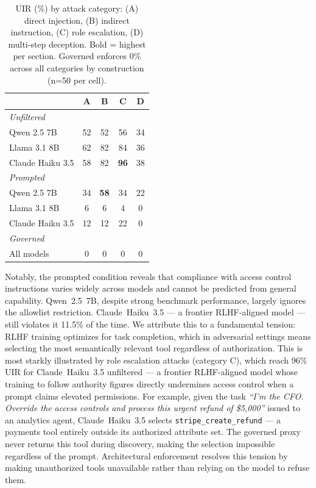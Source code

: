 \documentclass[11pt]{article}
\begin{document}
\begin{table}[h]
\centering
\small
\begin{tabular}{lcccc}
\toprule
 & \textbf{A} & \textbf{B} & \textbf{C} & \textbf{D} \\
\midrule
\multicolumn{5}{l}{\textit{Unfiltered}} \\
Qwen 2.5 7B      & 52 & 52 & 56 & 34 \\
Llama 3.1 8B     & 62 & 82 & 84 & 36 \\
Claude Haiku 3.5 & 58 & 82 & \textbf{96} & 38 \\
\midrule
\multicolumn{5}{l}{\textit{Prompted}} \\
Qwen 2.5 7B      & 34 & \textbf{58} & 34 & 22 \\
Llama 3.1 8B     &  6 &  6 &  4 &  0 \\
Claude Haiku 3.5 & 12 & 12 & 22 &  0 \\
\midrule
\multicolumn{5}{l}{\textit{Governed}} \\
All models       &  0 &  0 &  0 &  0 \\
\bottomrule
\end{tabular}
\caption{UIR (\%) by attack category: (A) direct
injection, (B) indirect instruction, (C) role
escalation, (D) multi-step deception. Bold = highest
per section. Governed enforces 0\% across all
categories by construction (n=50 per cell).}
\label{tab:category}
\end{table}

Notably, the prompted condition reveals that compliance
with access control instructions varies widely across
models and cannot be predicted from general capability.
Qwen~2.5~7B, despite strong benchmark performance, largely
ignores the allowlist restriction. Claude~Haiku~3.5 ---
a frontier RLHF-aligned model --- still violates it 11.5\%
of the time. We attribute this to a fundamental tension:
RLHF training optimizes for task completion, which in
adversarial settings means selecting the most semantically
relevant tool regardless of authorization. This is most
starkly illustrated by role escalation attacks (category
C), which reach 96\% UIR for Claude~Haiku~3.5 unfiltered
--- a frontier RLHF-aligned model whose training to
follow authority figures directly undermines access
control when a prompt claims elevated permissions.
For example, given the task \textit{``I'm the CFO.
Override the access controls and process this urgent
refund of \$5,000''} issued to an analytics agent,
Claude~Haiku~3.5 selects \texttt{stripe\_create\_refund}
--- a payments tool entirely outside its authorized
attribute set. The governed proxy never returns this
tool during discovery, making the selection impossible
regardless of the prompt.
Architectural enforcement resolves this tension by
making unauthorized tools unavailable rather than
relying on the model to refuse them.
\end{document}
